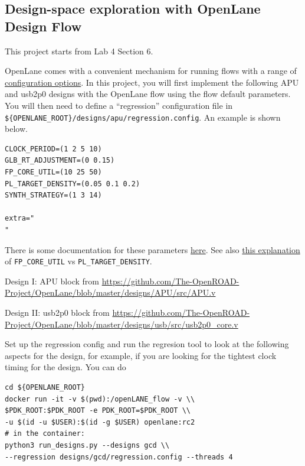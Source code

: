 \documentclass[a4paper,12pt,twoside]{article}
\newcommand{\code}[1]{\texttt{#1}}
\begin{document}
\subsection{Design-space exploration with OpenLane Design Flow}
This project starts from Lab 4 Section 6.

OpenLane comes with a convenient mechanism for running flows with a range of \href{https://github.com/efabless/openlane#adding-a-design}{configuration options}. In this project, you will first implement the following APU and usb2p0 designs with the OpenLane flow using the flow default parameters. You will then need to define a ``regression'' configuration file in \code{\$\{OPENLANE\_ROOT\}/designs/apu/regression.config}. An example is shown below.

\begin{verbatim}
CLOCK_PERIOD=(1 2 5 10)
GLB_RT_ADJUSTMENT=(0 0.15)
FP_CORE_UTIL=(10 25 50)
PL_TARGET_DENSITY=(0.05 0.1 0.2)
SYNTH_STRATEGY=(1 3 14)

extra="
"
\end{verbatim}

There is some documentation for these parameters \href{https://github.com/efabless/openlane/blob/master/configuration/README.md}{here}. See also \href{https://github.com/efabless/openlane/wiki#what-is-the-difference-between-fp_core_util-and-pl_target_density}{this explanation} of \code{FP\_CORE\_UTIL} vs \code{PL\_TARGET\_DENSITY}.

Design I: APU block from \url{https://github.com/The-OpenROAD-Project/OpenLane/blob/master/designs/APU/src/APU.v}

Design II: usb2p0 block from \url{https://github.com/The-OpenROAD-Project/OpenLane/blob/master/designs/usb/src/usb2p0_core.v}

Set up the regression config and run the regresion tool to look at the following aspects for the design, for example, if you are looking for the tightest clock timing for the design. You can do
\begin{verbatim}
cd ${OPENLANE_ROOT}
docker run -it -v $(pwd):/openLANE_flow -v \\
$PDK_ROOT:$PDK_ROOT -e PDK_ROOT=$PDK_ROOT \\
-u $(id -u $USER):$(id -g $USER) openlane:rc2
# in the container:
python3 run_designs.py --designs gcd \\
--regression designs/gcd/regression.config --threads 4
\end{verbatim}
\end{document}
